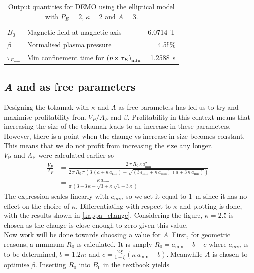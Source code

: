 \begin{table}
\begin{tabular}{llr}
		\(B_0\)                   & Magnetic field at magnetic axis                                & \SI{6.0714}{\tesla}              \\
		\(\beta\)                 & Normalised plasma pressure                                     & 4.55\%                           \\
		\(\tau_{E_\mathrm{min}}\) & Min confinement time for \(\pqty{p\times\tau_E}_\mathrm{min}\) & \SI{1.2588}{\second}             \\
		\bottomrule
	\end{tabular}
	\caption{Output quantities for DEMO using the elliptical model with $P_{\si{E}}=2$, $\kappa=2$ and $A=3$.}
	\label{tab:DEMO2}
\end{table}
\subsection{\textit{A} and \mathinhead{\kappa}{\kappa} as free parameters}
Designing the tokamak with $\kappa$ and $A$ as free parameters has led us to try and maximise profitability from $V_{P}/A_{P}$ and $\beta$. Profitability in this context means that increasing the size of the tokamak leads to an increase in these parameters. However, there is a point when the change vs increase in size becomes constant. This means that we do not profit from increasing the size any longer. \\
$V_{\mathrm{P}}$ and $A_{\mathrm{P}}$ were calculated earlier so
\begin{align}
	\frac{V_{\si{P}}}{A_{\si{P}}} & =\frac{2\,\pi\, R_{0}\,\kappa\, a_{\min}^{2}}{2\,\pi\, R_{0}\,\pi\, (3\,(a+\kappa\, a_{\min})-\sqrt{(3\, a_{\min}+\kappa\, a_{\min})\,(a+3\,\kappa\, a_{\min})})} \nonumber \\
	                              & =\frac{\kappa\, a_{\min}}{\pi\,(3+3\,\kappa-\sqrt{3+\kappa}\,\sqrt{1+3\,\kappa})}
\end{align}
The expression scales linearly with $a_{min}$ so we set it equal to \SI{1}{\meter} since it has no effect on the choice of $\kappa$. Differentiating with respect to $\kappa$ and plotting is done, with the results shown in \cref{kappa_change}. Considering the figure, $\kappa=2.5$ is chosen as the change is close enough to zero given this value.\\
Now work will be done towards choosing a value for $A$. First, for geometric reasons, a minimum $R_{0}$ is calculated. It is simply $R_{0}=a_{\min}+b+c$ where $a_{min}$ is to be determined, $b=1.2\si{m}$ and $c=\frac{2\,\xi}{1-\xi}(\kappa\, a_{\min}+b)$. Meanwhile $A$ is chosen to optimise $\beta$. Inserting $R_{0}$ into $B_{0}$ in the textbook yields
